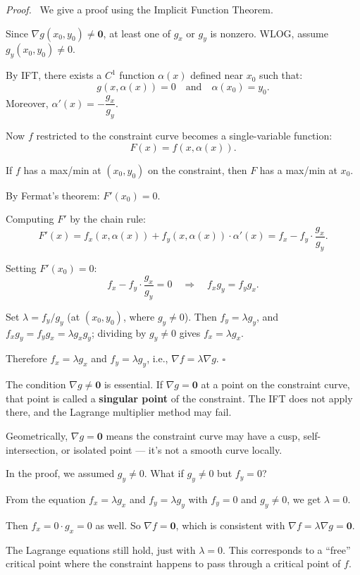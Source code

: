 \documentclass[11pt]{report}
\renewenvironment{proof}[1][Proof]{\par\noindent\textit{#1.}\ }{\hfill$\square$\par\medskip}
\begin{document}
\begin{proof}
We give a proof using the Implicit Function Theorem.

Since $\nabla g(x_0, y_0) \neq \mathbf{0}$, at least one of $g_x$ or $g_y$ is nonzero. WLOG, assume $g_y(x_0, y_0) \neq 0$.

By IFT, there exists a $C^1$ function $\alpha(x)$ defined near $x_0$ such that:
\[
g(x, \alpha(x)) = 0 \quad \text{and} \quad \alpha(x_0) = y_0.
\]
Moreover, $\alpha'(x) = -\dfrac{g_x}{g_y}$.

Now $f$ restricted to the constraint curve becomes a single-variable function:
\[
F(x) = f(x, \alpha(x)).
\]

If $f$ has a max/min at $(x_0, y_0)$ on the constraint, then $F$ has a max/min at $x_0$.

By Fermat's theorem: $F'(x_0) = 0$.

Computing $F'$ by the chain rule:
\[
F'(x) = f_x(x, \alpha(x)) + f_y(x, \alpha(x)) \cdot \alpha'(x) = f_x - f_y \cdot \frac{g_x}{g_y}.
\]

Setting $F'(x_0) = 0$:
\[
f_x - f_y \cdot \frac{g_x}{g_y} = 0 \quad \Longrightarrow \quad f_x g_y = f_y g_x.
\]

Set $\lambda = f_y / g_y$ (at $(x_0, y_0)$, where $g_y \neq 0$). Then $f_y = \lambda g_y$, and $f_x g_y = f_y g_x = \lambda g_x g_y$; dividing by $g_y \neq 0$ gives $f_x = \lambda g_x$.

Therefore $f_x = \lambda g_x$ and $f_y = \lambda g_y$, i.e., $\nabla f = \lambda \nabla g$.
\end{proof}

\begin{remark}
The condition $\nabla g \neq \mathbf{0}$ is essential. If $\nabla g = \mathbf{0}$ at a point on the constraint curve, that point is called a \textbf{singular point} of the constraint. The IFT does not apply there, and the Lagrange multiplier method may fail.

Geometrically, $\nabla g = \mathbf{0}$ means the constraint curve may have a cusp, self-intersection, or isolated point --- it's not a smooth curve locally.
\end{remark}

\begin{remark}[What if $f_y = 0$?]
In the proof, we assumed $g_y \neq 0$. What if $g_y \neq 0$ but $f_y = 0$?

From the equation $f_x = \lambda g_x$ and $f_y = \lambda g_y$ with $f_y = 0$ and $g_y \neq 0$, we get $\lambda = 0$.

Then $f_x = 0 \cdot g_x = 0$ as well. So $\nabla f = \mathbf{0}$, which is consistent with $\nabla f = \lambda \nabla g = \mathbf{0}$.

The Lagrange equations still hold, just with $\lambda = 0$. This corresponds to a ``free'' critical point where the constraint happens to pass through a critical point of $f$.
\end{remark}
\end{document}
